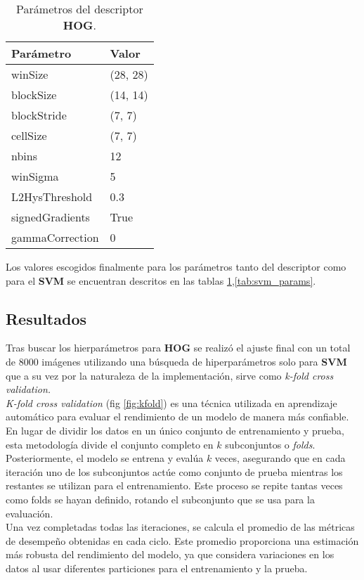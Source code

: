 \documentclass[12pt,letterpaper]{article}
\begin{document}
\begin{table}[htp]
    \centering
    \begin{tabular}{ll}
    \hline
    \textbf{Parámetro} & \textbf{Valor} \\
    \hline
    winSize & (28, 28) \\
    blockSize & (14, 14) \\
    blockStride & (7, 7) \\
    cellSize & (7, 7) \\
    nbins & 12 \\
    winSigma & 5 \\
    L2HysThreshold & 0.3 \\
    signedGradients & True \\
    gammaCorrection & 0 \\
    \hline
    \end{tabular}
    \caption{Parámetros del descriptor \textbf{HOG}.}
    \label{tab:hog_params}
\end{table}

Los valores escogidos finalmente para los parámetros tanto del descriptor como para el \textbf{SVM} se encuentran descritos en las tablas \ref{tab:hog_params},\ref{tab:svm_params}.

\subsection{Resultados}
Tras buscar los hierparámetros para \textbf{HOG} se realizó el ajuste final con un total de $8000$ imágenes utilizando una búsqueda de hiperparámetros solo para \textbf{SVM} que a su vez por la naturaleza de la implementación, sirve como \textit{k-fold cross validation.}\\[6pt]
\textit{K-fold cross validation} (fig \ref{fig:kfold}) es una técnica utilizada en aprendizaje automático para evaluar el rendimiento de un modelo de manera más confiable. En lugar de dividir los datos en un único conjunto de entrenamiento y prueba, esta metodología divide el conjunto completo en $k$ subconjuntos o \textit{folds}. Posteriormente, el modelo se entrena y evalúa $k$ veces, asegurando que en cada iteración uno de los subconjuntos actúe como conjunto de prueba mientras los restantes se utilizan para el entrenamiento. Este proceso se repite tantas veces como folds se hayan definido, rotando el subconjunto que se usa para la evaluación.\\[6pt]
Una vez completadas todas las iteraciones, se calcula el promedio de las métricas de desempeño obtenidas en cada ciclo. Este promedio proporciona una estimación más robusta del rendimiento del modelo, ya que considera variaciones en los datos al usar diferentes particiones para el entrenamiento y la prueba. 
\end{document}
